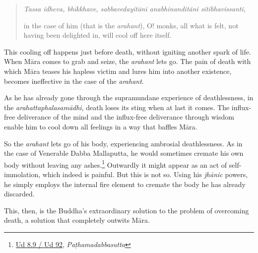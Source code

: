 \begin{quote}
\emph{Tassa idheva, bhikkhave, sabbavedayitāni anabhinanditāni sītibhavissanti,}

in the case of him (that is the \emph{arahant}), O! monks, all what is felt, not having been delighted in, will cool off here itself.
\end{quote}

This cooling off happens just before death, without igniting another spark of life. When Māra comes to grab and seize, the \emph{arahant} lets go. The pain of death with which Māra teases his hapless victim and lures him into another existence, becomes ineffective in the case of the \emph{arahant}.

As he has already gone through the supramundane experience of deathlessness, in the \emph{arahattaphalasamādhi}, death loses its sting when at last it comes. The influx-free deliverance of the mind and the influx-free deliverance through wisdom enable him to cool down all feelings in a way that baffles Māra.

So the \emph{arahant} lets go of his body, experiencing ambrosial deathlessness. As in the case of Venerable Dabba Mallaputta, he would sometimes cremate his own body without leaving any ashes.\footnote{\href{https://suttacentral.net/ud8.9/pli/ms}{Ud 8.9 / Ud 92}, \emph{Paṭhamadabbasutta}} Outwardly it might appear as an act of self-immolation, which indeed is painful. But this is not so. Using his \emph{jhānic} powers, he simply employs the internal fire element to cremate the body he has already discarded.

This, then, is the Buddha's extraordinary solution to the problem of overcoming death, a solution that completely outwits Māra.
